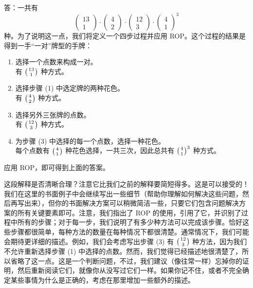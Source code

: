 \begin{example}[一对]
    \begin{proofs}{答}：一共有
        \[\begin{pmatrix}
                13 \\
                1
            \end{pmatrix} \cdot \begin{pmatrix}
                4 \\
                2
            \end{pmatrix} \cdot \begin{pmatrix}
                12 \\
                3
            \end{pmatrix} \cdot \begin{pmatrix}
                4 \\
                1
            \end{pmatrix}^3\]
        种。为了说明这一点，我们将定义一个四步过程并应用 ROP。这个过程的结果是得到一手``一对''牌型的手牌：
        \begin{enumerate}[label=(\arabic*)]
            \item 选择一个点数来构成一对。\\
                  有 $\big({13 \atop 1}\big)$ 种方式。
            \item 选择步骤 (1) 中选定牌的两种花色。\\
                  有 $\big({4 \atop 2}\big)$ 种方式。
            \item 选择另外三张牌的点数。\\
                  有 $\big({12 \atop 3}\big)$ 种方式。
            \item 为步骤 (3) 中选择的每一个点数，选择一种花色。\\
                  每个点数有 $\big({4 \atop 1}\big)$ 种花色选择，一共三次，因此总共有 $\big({4 \atop 1}\big)^3$ 种方式。
        \end{enumerate}
        应用 ROP，即可得到上面的答案。
    \end{proofs}

    这段解释是否清晰合理？注意它比我们之前的解释要简短得多。这是可以接受的！我们在这里的书面例子中会继续写出一些细节（帮助你理解如何解决这些问题，然后再写出来），但你的书面解决方案可以稍微简洁一些，只要它们包含问题解决方案的所有关键要素即可。注意，我们指出了 ROP 的使用，引用了它，并识别了过程中所有的步骤；对于每一步，我们说明了有多少种方法可以完成该步骤。恰好这些步骤都很简单，每种方法的数量在每种情况下都很清楚。通常情况下，我们可能会期待更详细的描述。例如，我们会考虑写出步骤 (3) 有 $\big({12 \atop 3}\big)$ 种方法，因为我们不允许重新选择步骤 (1) 中选择的点数。然而，我们觉得已经描述地很清楚了，所以省略了这一点。这是一个判断问题，不过，我们建议（像往常一样）忘掉你的证明，然后重新阅读它们，就像你从没写过它们一样。如果你记不住，或者不完全确定某些事情为什么是正确的，考虑在那里增加一些额外的描述。


\end{example}
